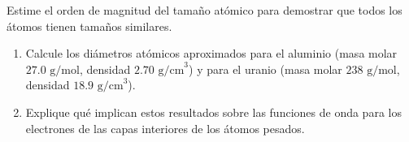\item Estime el orden de magnitud del tamaño atómico para demostrar que todos los átomos tienen tamaños similares.
\begin{enumerate}
    \item Calcule los diámetros atómicos aproximados para el aluminio (masa molar $27.0\text{ g/mol}$, densidad $2.70\text{ g/cm}^3$) y para el uranio (masa molar $238\text{ g/mol}$, densidad $18.9\text{ g/cm}^3$).
    \item Explique qué implican estos resultados sobre las funciones de onda para los electrones de las capas interiores de los átomos pesados.
\end{enumerate}